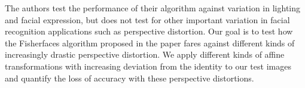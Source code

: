 \documentclass{amsart}
\theoremstyle{definition}
\theoremstyle{remark}
\begin{document}
The authors test the performance of their algorithm against variation in lighting and facial expression, but does not test for other important variation in facial recognition applications such as perspective distortion. Our goal is to test how the Fisherfaces algorithm proposed in the paper fares against different kinds of increasingly drastic perspective distortion. We apply different kinds of affine transformations with increasing deviation from the identity to our test images and quantify the loss of accuracy with these perspective distortions.


\end{document}
